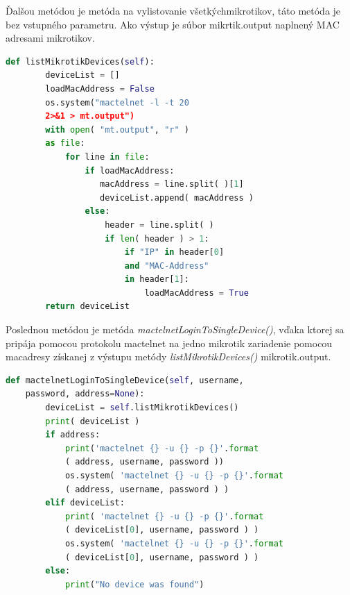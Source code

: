 Ďalšou metódou je metóda na vylistovanie všetkýchmikrotikov, táto metóda je bez vstupného parametru. Ako výstup je súbor mikrtik.output naplnený MAC adresami mikrotikov. 
\newpage
\begin{lstlisting}[language=python, frame=single, caption=Metóda listMikrotikDevices,captionpos=b, showstringspaces=false] 
def listMikrotikDevices(self):
        deviceList = []
        loadMacAddress = False
        os.system("mactelnet -l -t 20 
        2>&1 > mt.output")
        with open( "mt.output", "r" ) 
        as file:
            for line in file:
                if loadMacAddress:
                   macAddress = line.split( )[1]
                   deviceList.append( macAddress )
                else:
                    header = line.split( )
                    if len( header ) > 1:
                        if "IP" in header[0] 
                        and "MAC-Address" 
                        in header[1]:
                            loadMacAddress = True
        return deviceList
\end{lstlisting}
Poslednou metódou je metóda \textit{mactelnetLoginToSingleDevice()}, vďaka ktorej sa pripája pomocou protokolu mactelnet na jedno mikrotik zariadenie pomocou macadresy získanej z výstupu metódy \textit{listMikrotikDevices()} mikrotik.output.
\newpage
\begin{lstlisting}[language=python, frame=single, caption=Metóda mactelnetLoginToSingleDevice,captionpos=b, showstringspaces=false] 
def mactelnetLoginToSingleDevice(self, username, 
    password, address=None):
        deviceList = self.listMikrotikDevices()
        print( deviceList )
        if address:
            print('mactelnet {} -u {} -p {}'.format
            ( address, username, password ))
            os.system( 'mactelnet {} -u {} -p {}'.format
            ( address, username, password ) )
        elif deviceList:
            print( 'mactelnet {} -u {} -p {}'.format
            ( deviceList[0], username, password ) )
            os.system( 'mactelnet {} -u {} -p {}'.format
            ( deviceList[0], username, password ) )
        else:
            print("No device was found")
\end{lstlisting}
